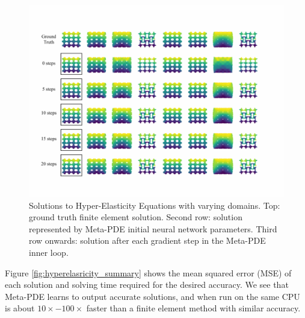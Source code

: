 \begin{figure}
  \centering
\includegraphics[width=0.6\linewidth]{figures/hyper_elasticity_circle_meta.pdf} 
\caption{Solutions to Hyper-Elasticity Equations with varying domains. Top: ground truth finite element solution. Second row: solution represented by Meta-PDE initial neural network parameters. Third row onwards: solution after each gradient step in the Meta-PDE inner loop.}
\label{fig:hyperelasticity_per_step}
\end{figure}

Figure \ref{fig:hyperelasricity_summary} shows the mean squared error (MSE) of each solution and solving time required for the desired accuracy. We see that Meta-PDE learns to output accurate solutions, and when run on the same CPU is about $10\times - 100\times$ faster than a finite element method with similar accuracy.
